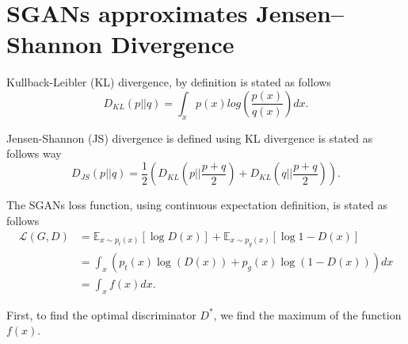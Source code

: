 \chapter{SGANs approximates Jensen–Shannon Divergence}
\label{apx:JSD}
Kullback-Leibler (KL) divergence, by definition is stated as follows
\begin{equation*}
  D_{KL}(p || q) = \int_xp(x)log\left(\frac{p(x)}{q(x)}\right)dx. 
\end{equation*}

Jensen-Shannon (JS) divergence is defined using KL divergence is stated as follows
way
\begin{equation*}
D_{JS}(p || q) = \frac{1}{2}\left(D_{KL}\left(p || \frac{p+q}{2}\right) + D_{KL}\left(q || \frac{p+q}{2}\right)\right).
\end{equation*}


The SGANs loss function, using continuous expectation definition, is stated as follows
\begin{equation*}
  \begin{split}
    \mathcal{L}(G, D) & =  \mathbb{E}_{x \sim p_t(x)}[\log{D(x)}] +  \mathbb{E}_{x \sim p_g(x)}[\log{1 - D(x)}] \\
    & = \int_x(p_t(x)\log{(D(x))} + p_g(x)\log{(1-D(x))})dx \\
    & = \int_xf(x)dx.
  \end{split}
\end{equation*}

First, to find the optimal discriminator $D^*$, we find the maximum of the
function $f(x)$.

